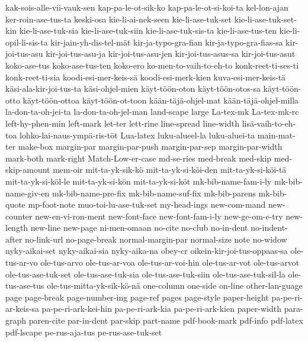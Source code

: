 {  kak-sois-alle-vii-vauk-sen
  kap-pa-le-ot-sik-ko
  kap-pa-le-ot-si-koi-ta
  kel-lon-ajan
  ker-roin-ase-tus-ta
  keski-osa
  kie-li-ai-nek-seen
  kie-li-ase-tuk-set
  kie-li-ase-tuk-set-kin
  kie-li-ase-tuk-sia
  kie-li-ase-tuk-siin
  kie-li-ase-tuk-sis-ta
  kie-li-ase-tus-ten
  kie-li-opil-li-sis-ta
  kir-jain-yh-dis-tel-mät
  kir-ja-typo-gra-fian
  kir-ja-typo-gra-fias-sa
  kir-joi-tus-asu
  kir-joi-tus-asu-ja
  kir-joi-tus-asu-jen
  kir-joi-tus-asus-sa
  kir-joi-tus-asut
  koko-ase-tus
  koko-ase-tus-ten
  koko-ero
  ko-men-to-vaih-to-eh-to
  konk-reet-ti-ses-ti
  konk-reet-ti-sia
  koodi-esi-mer-keis-sä
  koodi-esi-merk-kien
  kuva-esi-mer-keis-tä
  käsi-ala-kir-joi-tus-ta
  käsi-ohjel-mien
  käyt-töön-oton
  käyt-töön-otos-sa
  käyt-töön-otto
  käyt-töön-ottoa
  käyt-töön-ot-toon
  kään-täjä-ohjel-mat
  kään-täjä-ohjel-milla
  la-don-ta-oh-jei-ta
  la-don-ta-oh-jel-man
  land-scape
  large
  La-tex-mk
  La-tex-mk-rc
  left-hy-phen-min
  left-mark
  let-ter
  lett-rine
  line-spread
  line-width
  lisä-vaih-to-eh-toa
  lohko-lai-naus-ympä-ris-töt
  Lua-latex
  luku-alueel-la
  luku-aluei-ta
  main-mat-ter
  make-box
  margin-par
  margin-par-push
  margin-par-sep
  margin-par-width
  mark-both
  mark-right
  Match-Low-er-case
  md-se-ries
  med-break
  med-skip
  med-skip-amount
  mem-oir
  mit-ta-yk-sik-kö
  mit-ta-yk-si-köi-den
  mit-ta-yk-si-köi-tä
  mit-ta-yk-si-köl-le
  mit-ta-yk-si-kön
  mit-ta-yk-si-köt
  mk-bib-name-fam-i-ly
  mk-bib-name-giv-en
  mk-bib-name-pre-fix
  mk-bib-name-suf-fix
  mk-bib-parens
  mk-bib-quote
  mp-foot-note
  muo-toi-lu-ase-tuk-set
  my-head-ings
  new-com-mand
  new-counter
  new-en-vi-ron-ment
  new-font-face
  new-font-fam-i-ly
  new-ge-om-e-try
  new-length
  new-line
  new-page
  ni-men-omaan
  no-cite
  no-club
  no-in-dent
  no-indent-after
  no-link-url
  no-page-break
  normal-margin-par
  normal-size
  note
  no-widow
  nyky-aikai-set
  nyky-aikai-sia
  nyky-aika-na
  obey-cr
  oikein-kir-joi-tus-oppaas-sa
  ole-tus-ar-vo
  ole-tus-arvo
  ole-tus-ar-voa
  ole-tus-ar-voi-hin
  ole-tus-ar-vot
  ole-tus-arvot
  ole-tus-ase-tuk-set
  ole-tus-ase-tuk-sia
  ole-tus-ase-tuk-siin
  ole-tus-ase-tuk-sil-la
  ole-tus-ase-tus
  ole-tus-mitta-yk-sik-kö-nä
  one-column
  one-side
  on-line
  other-lan-guage
  page
  page-break
  page-number-ing
  page-ref
  pages
  page-style
  paper-height
  pa-pe-ri-ar-keis-sa
  pa-pe-ri-ark-kei-hin
  pa-pe-ri-ark-kia
  pa-pe-ri-ark-kien
  paper-width
  para-graph
  paren-cite
  par-in-dent
  par-skip
  part-name
  pdf-book-mark
  pdf-info
  pdf-latex
  pdf-lscape
  pe-rus-aja-tus
  pe-rus-ase-tuk-set
}
